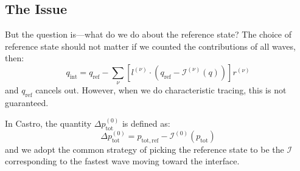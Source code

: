 \documentclass[12pt]{article}
\newcommand{\nup}{{(\nu)}}
\newcommand{\evz}{{(0)}}
\begin{document}
\subsection*{The Issue}

But the question is---what do we do
about the reference state?  The choice of reference state should not
matter if we counted the contributions of all waves, then:
\begin{equation}
q_\mathrm{int} = q_\mathrm{ref} - \sum_\nu [ l^\nup \cdot (q_\mathrm{ref} - \mathcal{I}^\nup(q)) ] r^\nup
\end{equation}
and $q_\mathrm{ref}$ cancels out.  However, when we do characteristic
tracing, this is not guaranteed.

In Castro, the quantity $\Delta p^\evz_\mathrm{tot}$ is defined as:
\begin{equation}
\Delta p^\evz_\mathrm{tot} =
  p_\mathrm{tot,ref} - \mathcal{I}^\evz(p_\mathrm{tot})
\end{equation}
and we adopt the common strategy of picking the reference state to be
the $\mathcal{I}$ corresponding to the fastest wave moving toward the
interface.
\end{document}
